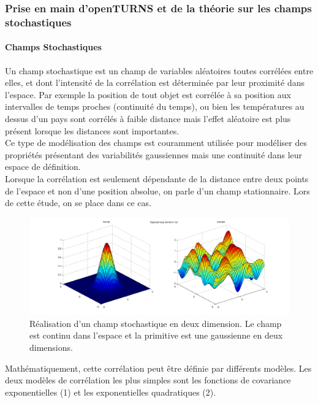 \documentclass[a4paper,10pt]{article}
\begin{document}
\subsubsection{Prise en main d'openTURNS et de la théorie sur les champs stochastiques}
\paragraph{Champs Stochastiques\\} 
Un champ stochastique est un champ de variables aléatoires toutes corrélées entre elles, et dont l'intensité de la corrélation est déterminée par leur proximité dans l'espace. Par exemple la position de tout objet est corrélée à sa position aux intervalles de temps proches (continuité du temps), ou bien les températures au dessus d'un pays sont corrélés à faible distance mais l'effet aléatoire est plus présent lorsque les distances sont importantes. \\
Ce type de modélisation des champs est couramment utilisée pour modéliser des propriétés présentant des variabilités gaussiennes mais une continuité dans leur espace de définition. \\ Lorsque la corrélation est seulement dépendante de la distance entre deux points de l'espace et non d'une position absolue, on parle d'un champ stationnaire. Lors de cette étude, on se place dans ce cas.\\ 

\newpage

\begin{figure}[H]
   \centering   \includegraphics[scale=0.25]{stochastic_process2d.png}
      \caption{Réalisation d'un champ stochastique en deux dimension. Le champ est continu dans l'espace et la primitive est une gaussienne en deux dimensions.}
         \label{realChamp}
\end{figure}

Mathématiquement, cette corrélation peut être définie par différents modèles. Les deux modèles de corrélation les plus simples sont les fonctions de covariance exponentielles (1) et les exponentielles quadratiques (2).  
\end{document}
